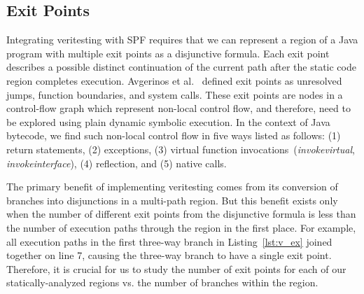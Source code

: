 \subsection{Exit Points}
\label{sec:exit_points}
%
Integrating veritesting with SPF requires that we can represent a region of a Java program with multiple exit points as a disjunctive formula.  Each exit point describes a possible distinct continuation of the current path after the static code region completes execution.  Avgerinos et al.~\cite{veritesting} defined exit points as unresolved jumps, function boundaries, and system calls.
%
These exit points are nodes in a control-flow graph which represent non-local control flow, and therefore, need to be explored using plain dynamic symbolic execution.
%
In the context of Java bytecode, we find such non-local control flow in five ways listed as follows: (1) return statements, (2) exceptions, (3) virtual function invocations~(\textit{invokevirtual}, \textit{invokeinterface}), (4) reflection, and (5) native calls.
%

%

%
The primary benefit of implementing veritesting comes from its conversion of branches into disjunctions in a multi-path region.
%
But this benefit exists only when the number of different exit points from the disjunctive formula is less than the number of execution paths through the region in the first place.
%
For example, all execution paths in the first three-way branch in
Listing~\ref{lst:v_ex} joined together on line 7, causing the three-way branch to have a single exit point.
%
Therefore, it is crucial for us to study the number of exit points for each of our statically-analyzed regions vs. the number of branches within the region.
%
%
%


